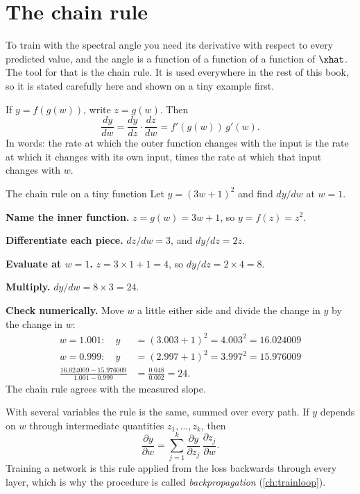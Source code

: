 \section{The chain rule}\label{sec:losses:chain}

To train with the spectral angle you need its derivative with respect to every predicted
value, and the angle is a function of a function of a function of $\xhat$. The tool for that
is the chain rule. It is used everywhere in the rest of this book, so it is stated carefully
here and shown on a tiny example first.

\begin{definition}
If $y = f(g(w))$, write $z = g(w)$. Then
\[
\frac{dy}{dw} = \frac{dy}{dz}\cdot\frac{dz}{dw} = f'(g(w))\, g'(w).
\]
In words: the rate at which the outer function changes with the input is the rate at which it
changes with its own input, times the rate at which that input changes with $w$.
\end{definition}

\begin{worked}[label={we:losses:chain}]{The chain rule on a tiny function}
Let $y = (3w + 1)^2$ and find $dy/dw$ at $w = 1$.

\textbf{Name the inner function.} $z = g(w) = 3w + 1$, so $y = f(z) = z^2$.

\textbf{Differentiate each piece.} $dz/dw = 3$, and $dy/dz = 2z$.

\textbf{Evaluate at $w = 1$.} $z = 3 \times 1 + 1 = 4$, so $dy/dz = 2 \times 4 = 8$.

\textbf{Multiply.} $dy/dw = 8 \times 3 = 24$.

\textbf{Check numerically.} Move $w$ a little either side and divide the change in $y$ by the
change in $w$:
\begin{align*}
w = 1.001: \quad y &= (3.003 + 1)^2 = 4.003^2 = 16.024009\\
w = 0.999: \quad y &= (2.997 + 1)^2 = 3.997^2 = 15.976009\\
\frac{16.024009 - 15.976009}{1.001 - 0.999} &= \frac{0.048}{0.002} = 24.
\end{align*}
The chain rule agrees with the measured slope.
\end{worked}

With several variables the rule is the same, summed over every path. If $y$ depends on $w$
through intermediate quantities $z_1, \dots, z_k$, then
\[
\frac{\partial y}{\partial w} = \sum_{j=1}^{k} \frac{\partial y}{\partial z_j}\,\frac{\partial z_j}{\partial w}.
\]
Training a network is this rule applied from the loss backwards through every layer, which is
why the procedure is called \emph{backpropagation}
(\cref{ch:trainloop}).

